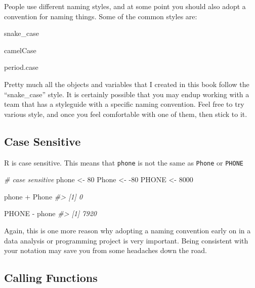 \documentclass[
]{book}
\newenvironment{Shaded}{\begin{snugshade}}{\end{snugshade}}
\newcommand{\CommentTok}[1]{\textcolor[rgb]{0.56,0.35,0.01}{\textit{#1}}}
\newcommand{\DecValTok}[1]{\textcolor[rgb]{0.00,0.00,0.81}{#1}}
\newcommand{\NormalTok}[1]{#1}
\newcommand{\OtherTok}[1]{\textcolor[rgb]{0.56,0.35,0.01}{#1}}
\newcommand{\SpecialCharTok}[1]{\textcolor[rgb]{0.00,0.00,0.00}{#1}}
\begin{document}
People use different naming styles, and at some point you should also adopt a
convention for naming things. Some of the common styles are:

\begin{Shaded}
\begin{Highlighting}[]
\NormalTok{snake\_case}

\NormalTok{camelCase}

\NormalTok{period.case}
\end{Highlighting}
\end{Shaded}

Pretty much all the objects and variables that I created in this book follow the
``snake\_case'' style. It is certainly possible that you may endup working with
a team that has a styleguide with a specific naming convention. Feel free to try
various style, and once you feel comfortable with one of them, then stick to it.

\hypertarget{case-sensitive}{%
\subsection{Case Sensitive}\label{case-sensitive}}

R is case sensitive. This means that \texttt{phone} is not the same as \texttt{Phone} or
\texttt{PHONE}

\begin{Shaded}
\begin{Highlighting}[]
\CommentTok{\# case sensitive}
\NormalTok{phone }\OtherTok{\textless{}{-}} \DecValTok{80}
\NormalTok{Phone }\OtherTok{\textless{}{-}} \SpecialCharTok{{-}}\DecValTok{80}
\NormalTok{PHONE }\OtherTok{\textless{}{-}} \DecValTok{8000}

\NormalTok{phone }\SpecialCharTok{+}\NormalTok{ Phone}
\CommentTok{\#\textgreater{} [1] 0}

\NormalTok{PHONE }\SpecialCharTok{{-}}\NormalTok{ phone}
\CommentTok{\#\textgreater{} [1] 7920}
\end{Highlighting}
\end{Shaded}

Again, this is one more reason why adopting a naming convention early on in
a data analysis or programming project is very important. Being consistent with
your notation may save you from some headaches down the road.

\hypertarget{calling-functions}{%
\subsection{Calling Functions}\label{calling-functions}}
\end{document}
